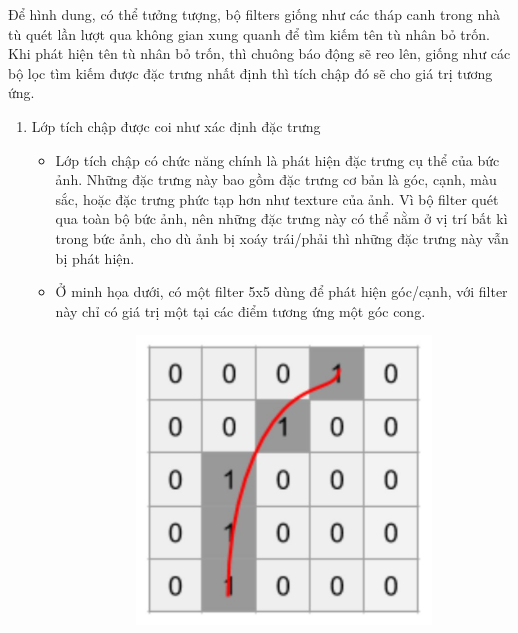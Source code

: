 Để hình dung, có thể tưởng tượng, bộ filters giống như các tháp canh trong nhà tù quét
lần lượt qua không gian xung quanh để tìm kiếm tên tù nhân bỏ trốn.
Khi phát hiện tên tù nhân bỏ trốn, thì chuông báo động sẽ reo lên, giống như các bộ lọc
tìm kiếm được đặc trưng nhất định thì tích chập đó sẽ cho giá trị tương ứng.

\begin{enumerate}
    \item Lớp tích chập được coi như xác định đặc trưng
          \begin{itemize}
              \item Lớp tích chập có chức năng chính là phát hiện đặc trưng cụ thể của bức ảnh.
                    Những đặc trưng này bao gồm đặc trưng cơ bản là góc, cạnh, màu sắc, hoặc đặc trưng
                    phức tạp hơn như texture của ảnh. Vì bộ filter quét qua toàn bộ bức ảnh, nên những
                    đặc trưng này có thể nằm ở vị trí bất kì trong bức ảnh, cho dù ảnh bị xoáy trái/phải
                    thì những đặc trưng này vẫn bị phát hiện.
              \item Ở minh họa dưới, có một filter 5x5 dùng để phát hiện góc/cạnh, với filter này
                    chỉ có giá trị một tại các điểm tương ứng một góc cong.
                    \begin{figure}
                        \begin{subfigure}{0.6\textwidth}
                            \begin{center}
                                \includegraphics[width=0.6\linewidth]{Chapters/items/chap2_3.jpg}
                            \end{center}
                            \label{fig: chap2_3}
                        \end{subfigure}

\end{figure}
\end{itemize}
\end{enumerate}
